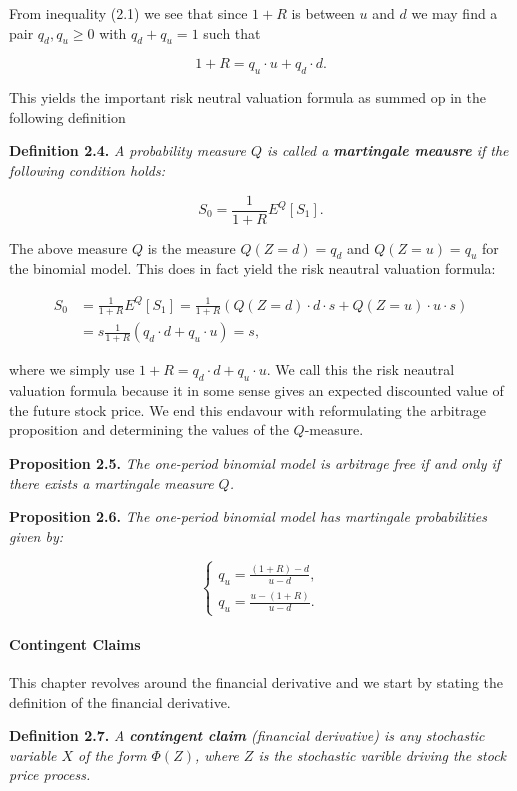 \documentclass[
]{article}
\begin{document}
From inequality (2.1) we see that since \(1+R\) is between \(u\) and
\(d\) we may find a pair \(q_d,q_u\ge 0\) with \(q_d+q_u=1\) such that

\[1+R=q_u\cdot u+q_d\cdot d.\]

This yields the important risk neutral valuation formula as summed op in
the following definition

\textbf{Definition 2.4.} \emph{A probability measure \(Q\) is called a
\textbf{martingale meausre} if the following condition holds:}

\[S_0=\frac{1}{1+R}E^Q[S_1].\]

The above measure \(Q\) is the measure \(Q(Z=d)=q_d\) and \(Q(Z=u)=q_u\)
for the binomial model. This does in fact yield the risk neautral
valuation formula:

\begin{align*}
S_0&=\frac{1}{1+R}E^Q[S_1]=\frac{1}{1+R}(Q(Z=d)\cdot d\cdot s+Q(Z=u)\cdot u\cdot s)\\
&=s\frac{1}{1+R}(q_d\cdot d+q_u\cdot u)=s,
\end{align*}

where we simply use \(1+R=q_d\cdot d+q_u\cdot u\). We call this the risk
neautral valuation formula because it in some sense gives an expected
discounted value of the future stock price. We end this endavour with
reformulating the arbitrage proposition and determining the values of
the \(Q\)-measure.

\textbf{Proposition 2.5.} \emph{The one-period binomial model is
arbitrage free if and only if there exists a martingale measure \(Q\).}

\textbf{Proposition 2.6.} \emph{The one-period binomial model has
martingale probabilities given by:}

\[\left\{\begin{matrix}q_u=\frac{(1+R)-d}{u-d},\\ q_u=\frac{u-(1+R)}{u-d}.\end{matrix}\right.\]

\hypertarget{contingent-claims}{%
\paragraph{Contingent Claims}\label{contingent-claims}}

This chapter revolves around the financial derivative and we start by
stating the definition of the financial derivative.

\textbf{Definition 2.7.} \emph{A \textbf{contingent claim} (financial
derivative) is \emph{any} stochastic variable \(X\) of the form
\(\Phi(Z)\), where \(Z\) is the stochastic varible driving the stock
price process.}
\end{document}
